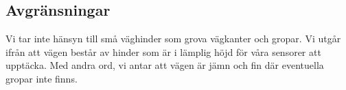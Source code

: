 \documentclass[kravspec/krav.tex]{subfiles}
\begin{document}
\subsection{Avgränsningar}
Vi tar inte hänsyn till små väghinder som grova vägkanter och gropar.  Vi utgår
ifrån att vägen består av hinder som är i lämplig höjd för våra sensorer att
upptäcka. Med andra ord, vi antar att vägen är jämn och fin där eventuella
gropar inte finns.
\end{document}
